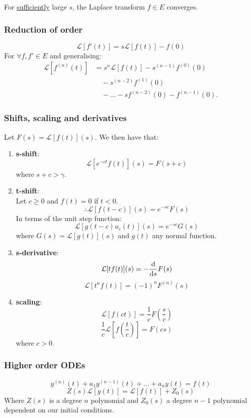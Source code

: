 \documentclass{article}
\begin{document}
\begin{multicols}{3}
For \underline{sufficiently} large $s$, the Laplace transform
$f\in E$ converges.

\subsubsection*{Reduction of order}
$$\mathcal{L}[f'(t)]=s\mathcal{L}[f(t)]-f(0)$$
For $\forall f,f'\in E$ and generalising:
\begin{align*}
    \mathcal{L}[f^{(n)}(t)]
    &=s^n\mathcal{L}[f(t)]
    -s^{(n-1)}f^{(0)}(0) \\
    &\quad-s^{(n-2)}f^{(1)}(0) \\
    &\quad-\dots-sf^{(n-2)}(0)-f^{(n-1)}(0).
\end{align*}

\subsubsection*{Shifts, scaling and derivatives}
Let $F(s)=\mathcal{L}[f(t)](s)$.
We then have that:
\begin{enumerate}
    \item \textbf{s-shift}:
    $$\mathcal{L}[e^{-ct}f(t)](s)=F(s+c)$$
    where $s+c>\gamma$.
    \item \textbf{t-shift}: \\
    Let $c\geq0$ and $f(t)=0$ if $t<0$.
    $$\therefore\mathcal{L}[f(t-c)](s)=e^{-sc}F(s)$$
    In terms of the unit step function:
    $$\mathcal{L}[g(t-c)u_c(t)](s)=e^{-sc}G(s)$$
    where $G(s)=\mathcal{L}[g(t)](s)$
    and $g(t)$ any normal function.

    \item \textbf{s-derivative}:
    $$\mathcal{L}[tf(t)](s)=-\dv{s}F(s)$$
    $$\mathcal{L}[t^n f(t)]
    =(-1)^n F^{(n)}(s)$$

    \item \textbf{scaling}:
    $$\mathcal{L}[f(ct)]=\frac{1}{c}F(\frac{s}{c})$$
    $$\frac{1}{c}\mathcal{L}[f(\frac{t}{c})]=F(cs)$$
    where $c>0$.
\end{enumerate}

\subsubsection*{Higher order ODEs}
$$y^{(n)}(t)+a_1y^{(n-1)}(t)+\dots
+a_n y(t)=f(t)$$
$$Z(s)\mathcal{L}[y(t)]
=\mathcal{L}[f(t)]+Z_0(s)$$
Where $Z(s)$ is a degree $n$ polynomial
and $Z_0(s)$ a degree $n-1$ polynomial dependent on our 
initial conditions.


\end{multicols}
\end{document}
